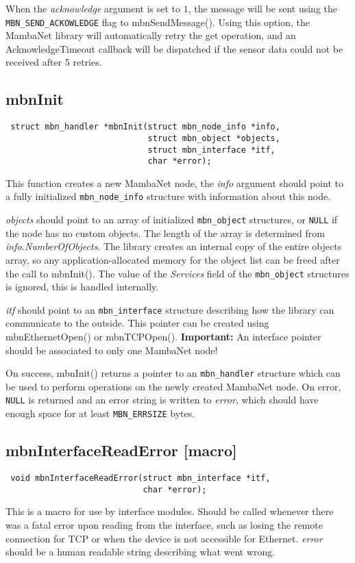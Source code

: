 \documentclass[a4paper]{report}
\begin{document}
When the \textit{acknowledge} argument is set to $1$, the message will be sent using the \verb|MBN_SEND_ACKOWLEDGE| flag to mbnSendMessage(). Using this option, the MambaNet library will automatically retry the get operation, and an AcknowledgeTimeout callback will be dispatched if the sensor data could not be received after 5 retries.


\subsection{mbnInit}
\begin{verbatim}
 struct mbn_handler *mbnInit(struct mbn_node_info *info,
                             struct mbn_object *objects,
                             struct mbn_interface *itf,
                             char *error);
\end{verbatim}
This function creates a new MambaNet node, the \textit{info} argument should point to a fully initialized \verb|mbn_node_info| structure with information about this node.

\textit{objects} should point to an array of initialized \verb|mbn_object| structures, or \verb|NULL| if the node has no custom objects. The length of the array is determined from \textit{info.NumberOfObjects}. The library creates an internal copy of the entire objects array, so any application-allocated memory for the object list can be freed after the call to mbnInit(). The value of the \textit{Services} field of the \verb|mbn_object| structures is ignored, this is handled internally.

\textit{itf} should point to an \verb|mbn_interface| structure describing how the library can communicate to the outside. This pointer can be created using mbnEthernetOpen() or mbnTCPOpen(). \textbf{Important:} An interface pointer should be associated to only one MambaNet node!

On success, mbnInit() returns a pointer to an \verb|mbn_handler| structure which can be used to perform operations on the newly created MambaNet node. On error, \verb|NULL| is returned and an error string is written to \textit{error}, which should have enough space for at least \verb|MBN_ERRSIZE| bytes.


\subsection{mbnInterfaceReadError \footnotesize{[macro]}}
\begin{verbatim}
 void mbnInterfaceReadError(struct mbn_interface *itf,
                            char *error);
\end{verbatim}
This is a macro for use by interface modules. Should be called whenever there was a fatal error upon reading from the interface, such as losing the remote connection for TCP or when the device is not accessible for Ethernet. \textit{error} should be a human readable string describing what went wrong.
\end{document}
